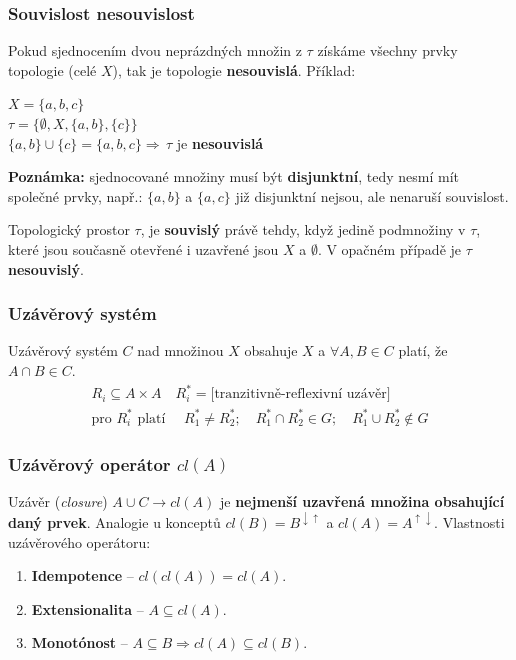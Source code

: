 \subsubsection{Souvislost nesouvislost}
Pokud sjednocením dvou neprázdných množin z $\tau$ získáme všechny prvky topologie (celé $ X $), tak je topologie \textbf{nesouvislá}. Příklad:

\begin{center}
\begin{minipage}[t]{0.50\textwidth}
	$X = \{a, b, c\}$\\
	$\tau = \{\emptyset, X, \{a, b\}, \{c\}\}$\\
	$\{a, b\} \cup \{c\}  = \{a, b, c\} \Rightarrow \, \tau$ je \textbf{nesouvislá}
\end{minipage}
\begin{minipage}[t]{0.40\textwidth}
	\textbf{Poznámka:} sjednocované množiny musí být \textbf{disjunktní}, tedy nesmí mít společné prvky, např.: $\{a, b\}$ a $\{a, c\}$ již disjunktní nejsou, ale nenaruší souvislost.
\end{minipage}
\end{center}
\smallskip
Topologický prostor $ \tau $, je \textbf{souvislý} právě tehdy, když jedině podmnožiny v $\tau$, které jsou současně otevřené i uzavřené jsou $X$ a $\emptyset$. V opačném případě je $\tau$ \textbf{nesouvislý}.

\subsubsection{Uzávěrový systém}
Uzávěrový systém $C$ nad množinou $X$ obsahuje $X$ a $\forall A, B \in C$ platí, že $A \cap B \in C$.
\begin{equation*}
\begin{aligned}
R_i \subseteq A \times A \quad R_i^* = \textrm{[tranzitivně-reflexivní uzávěr]}\\
\textrm{pro } R_i^* \textrm{ platí } \quad R_1^* \neq R_2^*; \quad R_1^* \cap R_2^* \in G;\quad R_1^* \cup R_2^* \notin G
\end{aligned}
\end{equation*}

\subsubsection{Uzávěrový operátor $cl(A)$}
Uzávěr (\textit{closure}) $A \cup C \rightarrow cl(A)$ je \textbf{nejmenší uzavřená množina obsahující daný prvek}. Analogie u konceptů $cl(B) = B^{\downarrow\uparrow}$ a $cl(A) = A^{\uparrow\downarrow}$. Vlastnosti uzávěrového operátoru:
\begin{enumerate}
\item \textbf{Idempotence} -- $cl(cl(A)) = cl(A)$.
\item \textbf{Extensionalita} -- $A \subseteq cl(A)$.
\item \textbf{Monotónost} -- $A \subseteq B \Rightarrow cl(A) \subseteq cl(B)$.
\end{enumerate}

